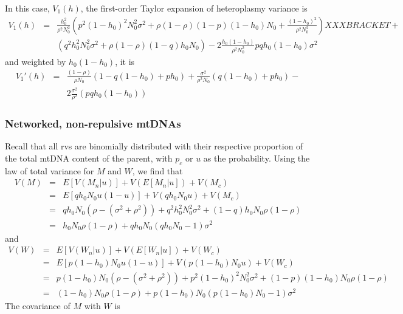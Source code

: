 \documentclass{article}
\begin{document}
In this case, $V_1(h)$, the first-order Taylor expansion of heteroplasmy variance is
    \begin{eqnarray}
      V_1(h) &= &\frac{h_0^2}{\rho^2N_0^2}   ( p^2(1-h_0)^2N_0^2\sigma^2+\rho(1-\rho)(1-p)(1-h_0)N_0 +\frac{(1-h_0)^2}{\rho^2N_0^2} )XXX BRACKET + \nonumber \\
  &&      (q^2h_0^2N_0^2\sigma^2+\rho(1-\rho)(1-q)h_0N_0) -2\frac{h_0(1-h_0)}{\rho^2N_0^2}pqh_0(1-h_0)\sigma^2
    \end{eqnarray}
and weighted by $h_0(1-h_0)$, it is
    \begin{eqnarray}
      V_1'(h)& = &\frac{(1-\rho)}{\rho N_0}\left(1-q(1-h_0)+ph_0\right) +  \frac{\sigma^2}{\rho^2 N_0}\left(q(1-h_0)+ph_0\right) -\nonumber\\
             && 2\frac{\sigma^2}{\rho^2}\left(pqh_0(1-h_0)\right)
    \end{eqnarray}

\subsubsection*{Networked, non-repulsive mtDNAs}
Recall that all rvs are binomially distributed with their respective proportion of the total mtDNA content of the parent, with $p_c$ or $u$ as the probability. Using the law of total variance for $M$ and $W$, we find that
    \begin{eqnarray}
   V(M) & = &E[V(M_n|u)]+V(E[M_n|u])+V(M_c) \\
        & = &E[qh_0N_0u(1-u)]+V(qh_0N_0u)+V(M_c)\\
        & = &qh_0N_0(\rho-(\sigma^2+\rho^2))+q^2h_0^2N_0^2\sigma^2+(1-q)h_0N_0\rho(1-\rho)\\
        & =&h_0N_0\rho(1-\rho)+qh_0N_0(qh_0N_0-1)\sigma^2 \label{eq:VarM_NetStoch}
    \end{eqnarray}
and
    \begin{eqnarray}
   V(W) & = &E[V(W_n|u)]+V(E[W_n|u])+V(W_c)\\
        & = &E[p(1-h_0)N_0u(1-u)]+V(p(1-h_0)N_0u)+V(W_c)\\
        & = &p(1-h_0)N_0(\rho-(\sigma^2+\rho^2))+p^2(1-h_0)^2N_0^2\sigma^2+(1-p)(1-h_0)N_0\rho(1-\rho)\\
        & =&(1-h_0)N_0\rho(1-\rho)+p(1-h_0)N_0(p(1-h_0)N_0-1)\sigma^2 \label{eq:VarW_NetStoch}
    \end{eqnarray}
The covariance of $M$ with $W$ is
\end{document}
